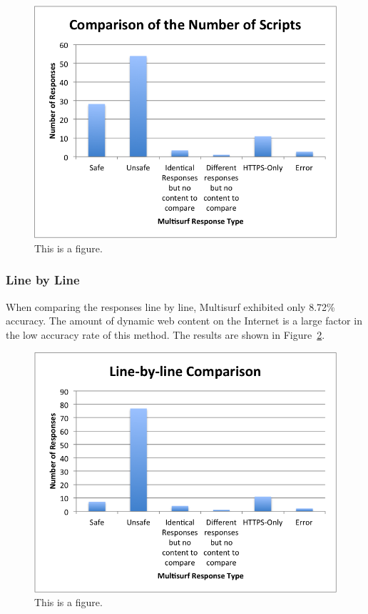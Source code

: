 \begin{figure}[htb]
\label{fig:scripts}
\begin{center}
\includegraphics[width=\linewidth]{scripts}
\caption{This is a figure.}
\end{center}
\end{figure}

\subsubsection{Line by Line}
When comparing the responses line by line, Multisurf exhibited only 8.72\% accuracy.  The amount of dynamic web content on the Internet is a large factor in the low accuracy rate of this method.  The results are shown in Figure~\ref{fig:lines}.

\begin{figure}[htb]
\label{fig:lines}
\begin{center}
\includegraphics[width=\linewidth]{lines}
\caption{This is a figure.}
\end{center}
\end{figure}

